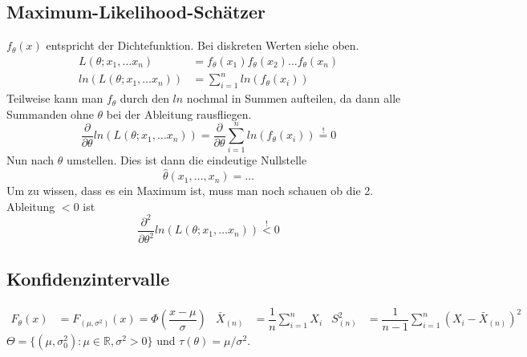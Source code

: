 \documentclass[
ngerman,
accentcolor=9c,%
type=intern,
marginpar=false
]{tudapub}
\begin{document}
        \subsection{Maximum-Likelihood-Schätzer}
            $f_\theta(x)$ entspricht der Dichtefunktion. Bei diskreten Werten siehe oben.
            \begin{align*}
                L(\theta; x_1, \dots x_n) &= f_\theta(x_1)f_\theta(x_2)\dots f_\theta(x_n)\\
                ln\left( L(\theta; x_1, \dots x_n) \right) &= \sum_{i=1}^{n}ln\left( f_\theta(x_i) \right)
            \end{align*}
            Teilweise kann man $f_\theta$ durch den $ln$ nochmal in Summen aufteilen, da dann alle Summanden ohne $\theta$ bei der Ableitung rausfliegen.
            \begin{equation*}
                \frac{\partial}{\partial \theta} ln\left( L(\theta; x_1, \dots x_n) \right) =
                \frac{\partial}{\partial \theta} \sum_{i=1}^{n}ln\left( f_\theta(x_i) \right) \overset{!}{=} 0
            \end{equation*}
            Nun nach $\theta$ umstellen. Dies ist dann die eindeutige Nullstelle
            \begin{equation*}
                \hat{\theta}(x_1, \dots, x_n) = \dots
            \end{equation*}
            Um zu wissen, dass es ein Maximum ist, muss man noch schauen ob die 2. Ableitung $<0$ ist
            \begin{equation*}
                \frac{\partial^2}{\partial \theta^2} ln\left( L(\theta; x_1, \dots x_n) \right) \overset{!}{<} 0
            \end{equation*}
        \subsection{Konfidenzintervalle}
            \begin{align*}
                F_\theta(x) &= F_{(\mu, \sigma^2)}(x)= \Phi(\dfrac{x-\mu}{\sigma}) &
                \bar{X}_{(n)}&=\dfrac{1}{n}\sum_{i=1}^n X_i &
                S^2_{(n)} &= \dfrac{1}{n-1}\sum_{i=1}^n (X_i - \bar{X}_{(n)})^2
            \end{align*}
            $\Theta = \{(\mu, \sigma^2_0):\mu \in \mathbb{R},\sigma^2 > 0\}$ und $\tau(\theta) = \mu/\sigma^2$.
\end{document}
